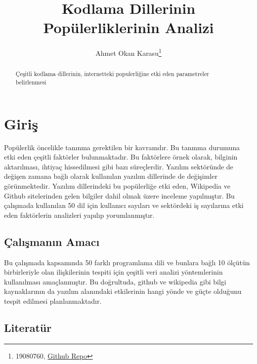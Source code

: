 \documentclass[
  12pt,
]{article}
\title{Kodlama Dillerinin Popülerliklerinin Analizi}
\author{Ahmet Okan Karasu\footnote{19080760, \href{https://github.com/ahmetokankarasu/Final_Odevi}{Github Repo}}}
\date{}
\begin{document}
\maketitle
\begin{abstract}
Çeşitli kodlama dillerinin, internetteki populerliğine etki eden parametreler belirlenmesi
\end{abstract}

\hypertarget{giriux15f}{%
\section{Giriş}\label{giriux15f}}

Popülerlik öncelikle tanınma gerektilen bir kavramdır. Bu tanınma durumuna etki eden çeşitli faktörler bulunmaktadır. Bu faktörlere örnek olarak, bilginin aktarılması, ihtiyaç hissedilmesi gibi bazı süreçlerdir. Yazılım sektöründe de değişen zamana bağlı olarak kullanılan yazılım dillerinde de değişimler görünmektedir. Yazılım dillerindeki bu popülerliğe etki eden, Wikipedia ve Github sitelerinden gelen bilgiler dahil olmak üzere inceleme yapılmıştır. Bu çalışmada kullanılan 50 dil için kullanıcı sayıları ve sektördeki iş sayılarına etki eden faktörlerin analizleri yapılıp yorumlanmıştır.

\hypertarget{uxe7alux131ux15fmanux131n-amacux131}{%
\subsection{Çalışmanın Amacı}\label{uxe7alux131ux15fmanux131n-amacux131}}

Bu çalışmada kapsamında 50 farklı programlama dili ve bunlara bağlı 10 ölçütün birbirleriyle olan ilişkilerinin tespiti için çeşitli veri analizi yöntemlerinin kullanılması amaçlanmıştır. Bu doğrultuda, github ve wikipedia gibi bilgi kaynaklarının da yazılım alanındaki etkilerinin hangi yönde ve güçte olduğunu tespit edilmesi planlanmaktadır.

\hypertarget{literatuxfcr}{%
\subsection{Literatür}\label{literatuxfcr}}
\end{document}
